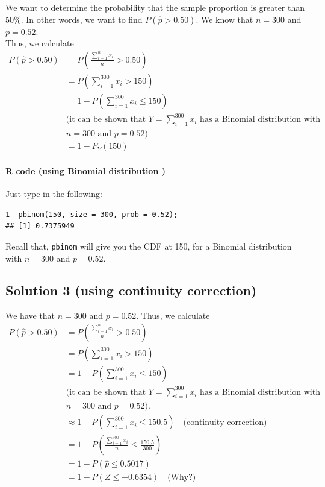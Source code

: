 We want to determine the probability that the sample proportion is greater than 50\%. In other words, we want to find $P(\hat{p} > 0.50)$. We know that 
$n = 300$ and $p = 0.52$. \\
Thus, we calculate
\begin{align*}
P(\hat{p} > 0.50) &= P\left(\frac{\sum_{i=1}^{n} x_i}{n} > 0.50\right) \\
&= P\left(\sum_{i=1}^{300} x_i > 150\right) \\
&= 1 - P\left(\sum_{i=1}^{300} x_i \leq 150\right) \\
&\text{(it can be shown that } Y = \sum_{i=1}^{300} x_i \text{ has a Binomial distribution with} \\
&n = 300 \text{ and } p = 0.52\text{)} \\
&= 1 - F_Y(150)
\end{align*}

\paragraph*{R code (using Binomial distribution )}

Just type in the following:

\begin{verbatim}
1- pbinom(150, size = 300, prob = 0.52);
## [1] 0.7375949
\end{verbatim}

Recall that, \texttt{pbinom} will give you the CDF at 150, for a Binomial distribution with $n = 300$ and $p = 0.52$.

\subsection*{Solution 3 (using continuity correction)}


We have that $n = 300$ and $p = 0.52$.
Thus, we calculate
\begin{align*}
P(\hat{p} > 0.50) &= P\left( \frac{\sum_{i=1}^{n} x_i}{n} > 0.50 \right) \\
&= P\left( \sum_{i=1}^{300} x_i > 150 \right) \\
&= 1 - P\left( \sum_{i=1}^{300} x_i \leq 150 \right) \\
&\text{(it can be shown that } Y = \sum_{i=1}^{300} x_i \text{ has a Binomial distribution with} \\
&n = 300 \text{ and } p = 0.52\text{)}. \\
&\approx 1 - P\left( \sum_{i=1}^{300} x_i \leq 150.5 \right) \quad \text{(continuity correction)} \\
&= 1 - P\left( \frac{\sum_{i=1}^{300} x_i}{n} \leq \frac{150.5}{300} \right) \\
&= 1 - P(\hat{p} \leq 0.5017) \\
&= 1 - P\left( Z \leq -0.6354 \right) \quad \text{(Why?)}
\end{align*}
